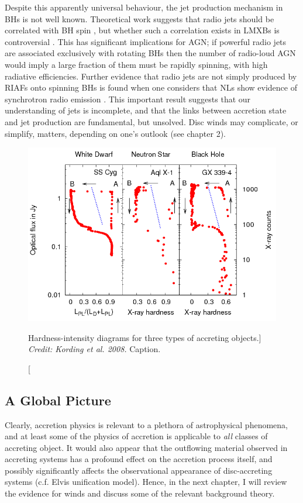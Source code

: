 Despite this apparently universal behaviour, 
the jet production mechanism in BHs is not well known. 
Theoretical work suggests that radio jets should be correlated with BH spin 
\citep{penrose1971,blandford1977}, 
but whether such a correlation exists in LMXBs is 
controversial \citep{fender2010,narayan2012}.
This has significant implications for AGN; if powerful radio jets are 
associated exclusively with rotating BHs then the number of radio-loud AGN
would imply a large fraction of them must be rapidly spinning, with
high radiative efficiencies. 
Further evidence that radio jets are not simply produced by RIAFs onto spinning
BHs is found when one considers that NLs show evidence of synchrotron
radio emission \citep{coppejans2015}. This important result suggests that our understanding
of jets is incomplete, and that the links between accretion state and 
jet production are fundamental, but unsolved. Disc winds may complicate, or simplify,
matters, depending on one's outlook (see chapter 2).

\begin{figure}
\centering
\includegraphics[width=1.0\textwidth]{figures/01-intro/kording_hid.png}
\caption
[Hardness-intensity diagrams for three types of accreting objects.]
{
{\sl Credit: Kording et al. 2008.} 
Caption.
} 
\label{fig:kording_hid}
\end{figure}

\subsection{A Global Picture}

Clearly, accretion physics is relevant to a plethora of astrophysical phenomena, 
and at least some of the physics of accretion is applicable to {\em all} 
classes of accreting object. 
It would also appear that the outflowing material observed in accreting systems 
has a profound effect on the accretion process itself, and 
possibly significantly affects the observational 
appearance of disc-accreting systems (c.f. Elvis unification model). 
Hence, in the next chapter, I will review the evidence for
winds and discuss some of the relevant background theory.

